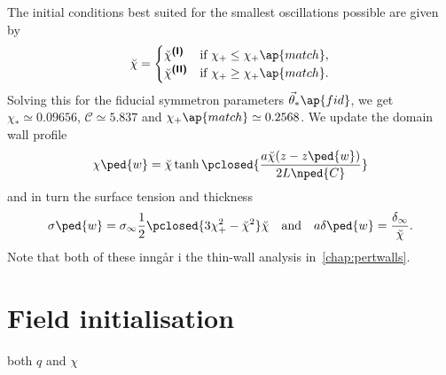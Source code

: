 The initial conditions best suited for the smallest oscillations possible are given by 
\begin{equation}\label{eq:PT:symm_dws:optimal_chi_breve}
    \brchi= \begin{cases}
        \brchi^{\text{\eqregimenum{I}}} &\text{if } \chi_+ \leq\chi_+\ap{match}, \\
        \brchi^{\text{\eqregimenum{II}}} &\text{if } \chi_+ \geq\chi_+\ap{match}.
    \end{cases}
\end{equation}
Solving this for the fiducial symmetron parameters $\vec{\theta}_\ast\ap{fid}$, we get $\chi_\ast \simeq 0.09656$, $\mathcal{C}\simeq 5.837$ and $\chi_+\ap{match}\simeq 0.2568$. We update the domain wall profile
\begin{equation}\label{eq:PT:symm_dws:chi_w_quasistatic_FLRW_updated}
    \chi\ped{w} = \brchi \tanh{\pclosed{ \frac{a\brchi(z-z\ped{w})}{2L\nped{C}} }}
\end{equation}
and in turn the surface tension and thickness
\begin{equation}
    \sigma\ped{w} = \sigma_\infty \frac{1}{2} \pclosed{ 3\chi_+^2- \brchi^2 }\brchi \quad\text{and}\quad a\delta\ped{w} = \frac{\delta_\infty}{\brchi} .
\end{equation}
Note that both of these inngår i the thin-wall analysis in~\cref{chap:pertwalls}.







\section{Field initialisation}
    \begin{bullets}
        \item both $q$ and $\chi$
    \end{bullets}




